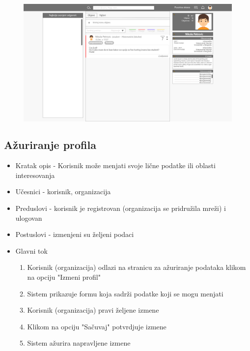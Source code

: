\begin{figure}[h!]
		\centerline{\includegraphics[width=\textwidth]{slike/profil.png}}
\end{figure}

\subsection{Ažuriranje profila}
\begin{itemize}
	\item Kratak opis - Korisnik može menjati svoje lične podatke ili oblasti interesovanja
	\item Učesnici - korisnik, organizacija
	\item Preduslovi - korisnik je registrovan (organizacija se pridružila mreži) i ulogovan
	\item Postuslovi - izmenjeni su željeni podaci
	\item Glavni tok
	\begin{enumerate}
		\item Korisnik (organizacija) odlazi na stranicu za ažuriranje podataka klikom na opciju "Izmeni profil"
		\item Sistem prikazuje formu koja sadrži podatke koji se mogu menjati
		\item Korisnik (organizacija) pravi željene izmene
		\item Klikom na opciju "Sačuvaj" potvrdjuje izmene
		\item Sistem ažurira napravljene izmene
	\end{enumerate}
\end{itemize}


